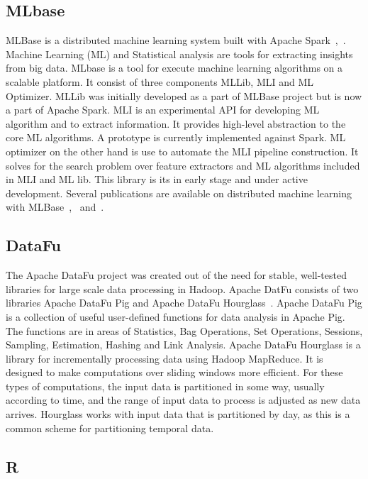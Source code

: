 \subsection{MLbase}
    
MLBase is a distributed machine learning system built with Apache
Spark~\cite{www-spark},~\cite{www-mlbase}.  Machine Learning (ML) and
Statistical analysis are tools for extracting insights from big data.
MLbase is a tool for execute machine learning algorithms on a scalable
platform. It consist of three components MLLib, MLI and ML
Optimizer. MLLib was initially developed as a part of MLBase project
but is now a part of Apache Spark. MLI is an experimental API for
developing ML algorithm and to extract information. It provides
high-level abstraction to the core ML algorithms. A prototype is
currently implemented against Spark. ML optimizer on the other hand is
use to automate the MLI pipeline construction. It solves for the
search problem over feature extractors and ML algorithms included in
MLI and ML lib. This library is its in early stage and under active
development. Several publications are available on distributed machine
learning with MLBase~\cite{mlbasepub1},~\cite{mlbasepub2}
and~\cite{mlbasepub3}.

    \pv


\subsection{DataFu}

The Apache DataFu project was created out of the need for stable,
well-tested libraries for large scale data processing in Hadoop.
Apache DatFu consists of two libraries Apache DataFu Pig and Apache
DataFu Hourglass~\cite{www-DataFu}. Apache DataFu Pig is a collection
of useful user-defined functions for data analysis in Apache Pig. The
functions are in areas of Statistics, Bag Operations, Set Operations,
Sessions, Sampling, Estimation, Hashing and Link Analysis.  Apache
DataFu Hourglass is a library for incrementally processing data using
Hadoop MapReduce. It is designed to make computations over sliding
windows more efficient. For these types of computations, the input
data is partitioned in some way, usually according to time, and the
range of input data to process is adjusted as new data arrives.
Hourglass works with input data that is partitioned by day, as this is
a common scheme for partitioning temporal data.

   \pv

\subsection{R}

